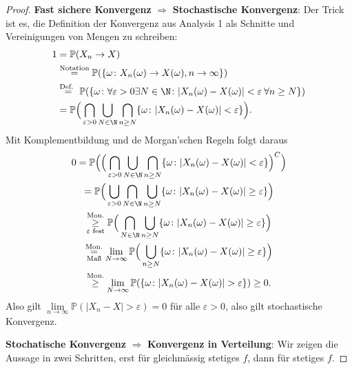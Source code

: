 \begin{proof}
\textbf{Fast sichere Konvergenz } $\Rightarrow$ \textbf{ Stochastische Konvergenz}: Der Trick ist es, die Definition der Konvergenz aus Analysis 1 als Schnitte und Vereinigungen von Mengen zu schreiben:
	\begin{align*}
			1& = \mathbb{P}(X_n \to X)\\
			& \overset{\text{Notation}}{=} \mathbb{P}(\{ \omega \colon X_n(\omega)\to X(\omega), n\to\infty \}) \\
			&\overset{\text{Def. }}{=} \mathbb{P}(\{\omega \colon \forall \varepsilon > 0 \exists N \in \N \colon |X_n(\omega) - X(\omega)| < \varepsilon \: \forall n \geq N \})\\
			&= \mathbb{P}\Big(\bigcap_{\varepsilon > 0} \bigcup_{N \in \N} \bigcap_{n \geq N} \{\omega \colon |X_n(\omega) - X(\omega)| < \varepsilon \}\Big).
		\end{align*}
		Mit Komplementbildung und de Morgan'schen Regeln folgt daraus
		\begin{gather*}
			0 = \mathbb{P}\Big(\Big(\bigcap_{\varepsilon > 0} \bigcup_{N \in \N} \bigcap_{n \geq N} \{\omega \colon |X_n(\omega) - X(\omega)| < \varepsilon \}\Big)^C\Big) \\
			= \mathbb{P}\Big(\bigcup_{\varepsilon > 0} \bigcap_{N \in \N} \bigcup_{n \geq N} \{\omega \colon |X_n(\omega) - X(\omega)| \geq \varepsilon \}\Big)\\
			\overset{\text{Mon.}}{\underset{\varepsilon\text{ fest}}{\geq}} \mathbb{P}\Big(\bigcap_{N \in \N} \bigcup_{n \geq N} \{\omega\colon |X_n(\omega) - X(\omega)| \geq \varepsilon \}\Big)\\
			\overset{\text{Mon.}}{\underset{\text{Maß}}{=}} \lim\limits_{N \to \infty} \mathbb{P}\Big(\bigcup_{n \geq N} \{\omega \colon |X_n(\omega) - X(\omega)| \geq \varepsilon \}\Big)\\ \overset{\text{Mon.}}{\geq} \lim\limits_{N \to \infty} \mathbb{P}(\{ \omega\colon | X_n(\omega) - X(\omega) | > \varepsilon \}) \geq 0.\\
		\end{gather*}
		Also gilt  $\lim\limits_{n \to \infty} \mathbb{P}(|X_n - X| > \varepsilon) = 0$ für alle $\varepsilon > 0$, also gilt stochastische Konvergenz.\smallskip


\textbf{Stochatische Konvergenz } $\Rightarrow$ \textbf{ Konvergenz in Verteilung}: Wir zeigen die Aussage in zwei Schritten, erst f\"ur gleichm\"assig stetiges $f$, dann f\"ur stetiges $f$.\smallskip


\end{proof}
